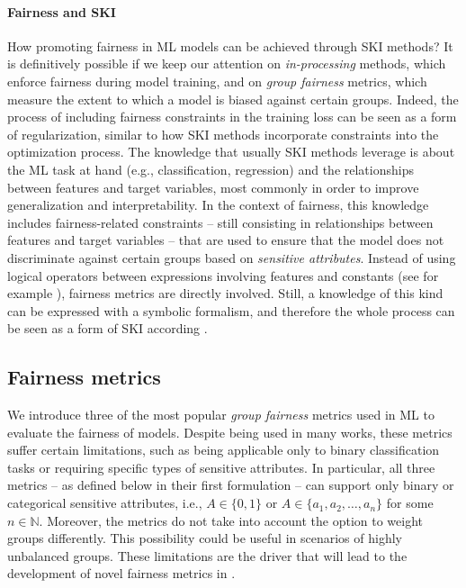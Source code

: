 \paragraph{Fairness and SKI}\label{par:fairness-ski}
%
How promoting fairness in \gls{ML} models can be achieved through \gls{SKI} methods?
%
It is definitively possible if we keep our attention on \emph{in-processing} methods, which enforce fairness during model training, and on \emph{group fairness} metrics, which measure the extent to which a model is biased against certain groups.
%
Indeed, the process of including fairness constraints in the training loss can be seen as a form of regularization, similar to how \gls{SKI} methods incorporate constraints into the optimization process.
%
The knowledge that usually \gls{SKI} methods leverage is about the \gls{ML} task at hand (e.g., classification, regression) and the relationships between features and target variables, most commonly in order to improve generalization and interpretability.
%
In the context of fairness, this knowledge includes fairness-related constraints -- still consisting in relationships between features and target variables -- that are used to ensure that the model does not discriminate against certain groups based on \emph{sensitive attributes}.
%
Instead of using logical operators between expressions involving features and constants (see for example ), fairness metrics are directly involved.
%
Still, a knowledge of this kind can be expressed with a symbolic formalism, and therefore the whole process can be seen as a form of \gls{SKI} according .


\subsection{Fairness metrics}\label{subsec:fairness-metrics}
%
We introduce three of the most popular \emph{group fairness} metrics used in \gls{ML} to evaluate the fairness of models.
%
Despite being used in many works, these metrics suffer certain limitations, such as being applicable only to binary classification tasks or requiring specific types of sensitive attributes.
%
In particular, all three metrics -- as defined below in their first formulation -- can support only binary or categorical sensitive attributes, i.e., \( A \in \{0, 1\} \) or \( A \in \{a_1, a_2, \ldots, a_n\} \) for some \( n \in \mathbb{N} \).
%
Moreover, the metrics do not take into account the option to weight groups differently.
%
This possibility could be useful in scenarios of highly unbalanced groups.
%
These limitations are the driver that will lead to the development of novel fairness metrics in .



